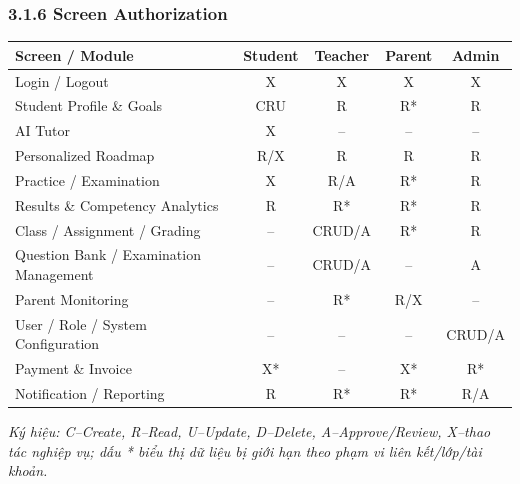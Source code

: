 \documentclass[12pt,a4paper,oneside]{report}
\begin{document}
\subsubsection*{3.1.6 Screen Authorization}
\renewcommand{\arraystretch}{1.15}
\begin{longtable}{|p{4.7cm}|c|c|c|c|}
\hline
\rowcolor{orange!15}
\textbf{Screen / Module} & \textbf{Student} & \textbf{Teacher} & \textbf{Parent} & \textbf{Admin} \\
\hline
Login / Logout & X & X & X & X \\
\hline
Student Profile \& Goals & CRU & R & R* & R \\
\hline
AI Tutor & X & -- & -- & -- \\
\hline
Personalized Roadmap & R/X & R & R & R \\
\hline
Practice / Examination & X & R/A & R* & R \\
\hline
Results \& Competency Analytics & R & R* & R* & R \\
\hline
Class / Assignment / Grading & -- & CRUD/A & R* & R \\
\hline
Question Bank / Examination Management & -- & CRUD/A & -- & A \\
\hline
Parent Monitoring & -- & R* & R/X & -- \\
\hline
User / Role / System Configuration & -- & -- & -- & CRUD/A \\
\hline
Payment \& Invoice & X* & -- & X* & R* \\
\hline
Notification / Reporting & R & R* & R* & R/A \\
\hline
\end{longtable}
\noindent\textit{Ký hiệu: C--Create, R--Read, U--Update, D--Delete, A--Approve/Review, X--thao tác nghiệp vụ; dấu * biểu thị dữ liệu bị giới hạn theo phạm vi liên kết/lớp/tài khoản.}
\end{document}
